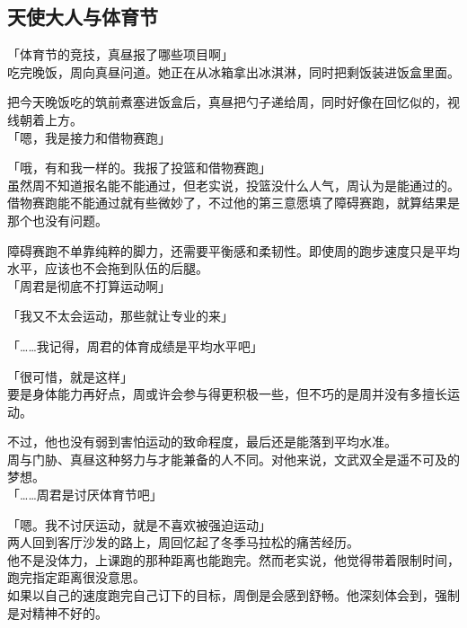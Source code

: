 \subsection{天使大人与体育节}

「体育节的竞技，真昼报了哪些项目啊」\\

吃完晚饭，周向真昼问道。她正在从冰箱拿出冰淇淋，同时把剩饭装进饭盒里面。

把今天晚饭吃的筑前煮塞进饭盒后，真昼把勺子递给周，同时好像在回忆似的，视线朝着上方。\\

「嗯，我是接力和借物赛跑」

「哦，有和我一样的。我报了投篮和借物赛跑」\\

虽然周不知道报名能不能通过，但老实说，投篮没什么人气，周认为是能通过的。\\

借物赛跑能不能通过就有些微妙了，不过他的第三意愿填了障碍赛跑，就算结果是那个也没有问题。

障碍赛跑不单靠纯粹的脚力，还需要平衡感和柔韧性。即使周的跑步速度只是平均水平，应该也不会拖到队伍的后腿。\\

「周君是彻底不打算运动啊」

「我又不太会运动，那些就让专业的来」

「……我记得，周君的体育成绩是平均水平吧」

「很可惜，就是这样」\\

要是身体能力再好点，周或许会参与得更积极一些，但不巧的是周并没有多擅长运动。

不过，他也没有弱到害怕运动的致命程度，最后还是能落到平均水准。\\

周与门胁、真昼这种努力与才能兼备的人不同。对他来说，文武双全是遥不可及的梦想。\\

「……周君是讨厌体育节吧」

「嗯。我不讨厌运动，就是不喜欢被强迫运动」\\

两人回到客厅沙发的路上，周回忆起了冬季马拉松的痛苦经历。\\

他不是没体力，上课跑的那种距离也能跑完。然而老实说，他觉得带着限制时间，跑完指定距离很没意思。\\

如果以自己的速度跑完自己订下的目标，周倒是会感到舒畅。他深刻体会到，强制是对精神不好的。\\


